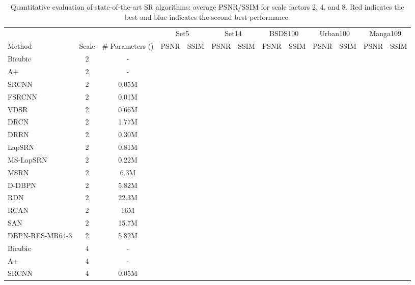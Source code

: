 \documentclass[10pt,journal,compsoc]{IEEEtran}
\begin{document}
\begin{table*}[t!]
\scriptsize
\caption{Quantitative evaluation of state-of-the-art SR algorithms: average PSNR/SSIM for scale factors 2, 4, and 8. {\color{red}Red} indicates the best and {\color{blue}blue} indicates the second best performance. }
\centering
\label{tab:psnr}
\begin{tabular}{*1l*1c*1c*2c*2c*2c*2c*2c}
\hline
 & & &\multicolumn{2}{c}{Set5} & \multicolumn{2}{c}{Set14}& \multicolumn{2}{c}{BSDS100}& \multicolumn{2}{c}{Urban100}&\multicolumn{2}{c}{Manga109} \\         
Method & Scale &\# Parameters () & PSNR&SSIM & PSNR&SSIM & PSNR&SSIM & PSNR&SSIM & PSNR&SSIM  \\
\hline
Bicubic&2								&-&&&&&&&&&&\\
A+~\cite{timofte2014a+}&2				&-&&&&&&&&&&\\
SRCNN~\cite{dong2016image}&2			&0.05M&&&&&&&&&&\\
FSRCNN~\cite{dong2016accelerating}&2		&0.01M&&&&&&&&&&\\
VDSR~\cite{Kim_2016_VDSR}&2			&0.66M&&&&&&&&&&\\
DRCN~\cite{kim2016deeply}&2				&1.77M&&&&&&&&&&\\
DRRN~\cite{Tai-DRRN-2017}&2			&0.30M&&&&&&&&&&\\
LapSRN~\cite{LapSRN}&2				&0.81M&&&&&&&&&&\\
MS-LapSRN~\cite{lai2018fast}&2			&0.22M&&&&&&&&&&\\
MSRN~\cite{li2018multi}&2				&6.3M&&&&&&&&&&\\
D-DBPN~\cite{haris2018deep} &2			&5.82M&&&&&&&&&&\\
RDN~\cite{zhang2018residual}&2			&22.3M&&{\color{blue}}&&{\color{red}}&&{\color{blue}}&&&&{\color{blue}}\\
RCAN~\cite{zhang2018image}&2			&16M&{\color{blue}}&{\color{blue}}&{\color{red}}&{\color{red}}&{\color{blue}}&{\color{red}}&{\color{red}}&{\color{red}}&{\color{red}}&{\color{red}}\\
SAN~\cite{dai2019second}&2				&15.7M&{\color{red}}&{\color{red}}&&{\color{red}}&{\color{red}}&{\color{red}}&{\color{blue}}&{\color{blue}}&{\color{blue}}&{\color{red}}\\
DBPN-RES-MR64-3 &2					&5.82M&&&{\color{blue}}&{\color{red}}&&&&&&\\
\hline
Bicubic&4								&-&&&&&&&&&&\\
A+~\cite{timofte2014a+}&4				&-&&&&&&&&&&\\
SRCNN~\cite{dong2016image}&4			&0.05M&&&&&&&&&&\\

\end{tabular}
\end{table*}
\end{document}

